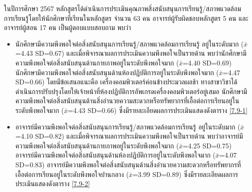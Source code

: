 ในปีการศึกษา 2567 หลักสูตรได้ดำเนินการประเมินคุณภาพสิ่งสนับสนุนการเรียนรู้/สภาพแวดล้อมการเรียนรู้โดยให้นักศึกษาที่เรียนในหลักสูตร จำนวน 63 คน อาจารย์ผู้รับผิดชอบหลักสูตร 5 คน  และอาจารย์ผู้สอน 17 คน เป็นผู้ตอบแบบสอบถาม พบว่า
\begin{itemize}
\item นักศึกษามีความพึงพอใจต่อสิ่งสนับสนุนการเรียนรู้/สภาพแวดล้อมการเรียนรู้ อยู่ในระดับมาก ($\bar x$ =4.43 SD=0.67)
และเมื่อพิจารณาผลการประเมินความพึงพอใจเป็นรายด้าน พบว่านักศึกษามีความพึงพอใจต่อสิ่งสนับสนุนด้านกายภาพอยู่ในระดับพึงพอใจมาก ($\bar x$=4.40 SD=0.69)  นักศึกษามีความพึงพอใจต่อสิ่งสนับสนุนด้านห้องปฏิบัติการอยู่ในระดับพึงพอใจมาก ($\bar x$=4.47 SD=0.66) โดยมีข้อเสนอแนะคือ เครื่องคอมพิวเตอร์ค่อนข้างประมวลผลช้า ทางสาขาวิชาได้ดำเนินการปรับปรุงโดยให้เจ้าหน้าที่ห้องปฏิบัติการอัพเกรดเครื่องคอมพิวเตอร์อยู่เสมอ
นักศึกษามีความพึงพอใจต่อสิ่งสนับสนุนด้านสิ่งอำนวยความสะดวกหรือทรัพยากรที่เอื้อต่อการเรียนอยู่ในระดับพึงพอใจมาก ($\bar x$=4.43 SD=0.66) ซึ่งมีรายละเอียดผลการประเมินแสดงดังตาราง \ref{7.9-1}
\item อาจารย์มีความพึงพอใจต่อสิ่งสนับสนุนการเรียนรู้/สภาพแวดล้อมการเรียนรู้ อยู่ในระดับมาก ($\bar x$ =4.10 SD=0.82)
และเมื่อพิจารณาผลการประเมินความพึงพอใจเป็นรายด้าน พบว่าอาจารย์มีความพึงพอใจต่อสิ่งสนับสนุนด้านกายภาพอยู่ในระดับพึงพอใจมาก ($\bar x$=4.25 SD=0.75)  อาจารย์มีความพึงพอใจต่อสิ่งสนับสนุนด้านห้องปฏิบัติการอยู่ในระดับพึงพอใจมาก ($\bar x$=4.07 SD=0.83)
อาจารย์มีความพึงพอใจต่อสิ่งสนับสนุนด้านสิ่งอำนวยความสะดวกหรือทรัพยากรที่เอื้อต่อการเรียนอยู่ในระดับพึงพอใจปานกลาง ($\bar x$=3.99 SD=0.89) ซึ่งมีรายละเอียดผลการประเมินแสดงดังตาราง \ref{7.9-2}
\end{itemize}
